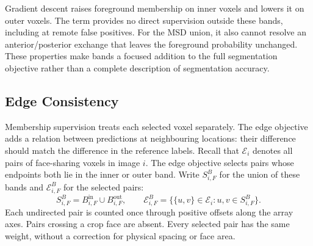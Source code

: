 \documentclass[12pt,a4paper]{article}
\begin{document}
Gradient descent raises foreground membership on inner voxels and lowers
it on outer voxels. The term provides no direct supervision outside
these bands, including at remote false positives. For the MSD union,
it also cannot resolve an anterior/posterior exchange that leaves the
foreground probability unchanged. These properties make bands a focused
addition to the full segmentation objective rather than a complete
description of segmentation accuracy.

\subsection{Edge Consistency}\label{sec:edge-constraints}

Membership supervision treats each selected voxel separately. The edge
objective adds a relation between predictions at neighbouring locations:
their difference should match the difference in the reference labels.
Recall that $\mathcal E_i$ denotes all pairs of face-sharing voxels in
image $i$. The edge objective selects pairs whose endpoints both lie
in the inner or outer band. Write $S_{i,F}^{B}$ for the union of these
bands and $\mathcal E_{i,F}^{B}$ for the selected pairs:
\begin{equation}
S_{i,F}^{B}=B_{i,F}^{\mathrm{in}}\cup B_{i,F}^{\mathrm{out}},
\qquad
\mathcal{E}_{i,F}^{B}
=\bigl\{\{u,v\}\in\mathcal{E}_i:
          u,v\in S_{i,F}^{B}\bigr\}.
\label{eq:edge-supported-pairs}
\end{equation}
Each undirected pair is counted once through positive offsets along
the array axes. Pairs crossing a crop face are absent. Every selected
pair has the same weight, without a correction for physical spacing or
face area.
\end{document}
